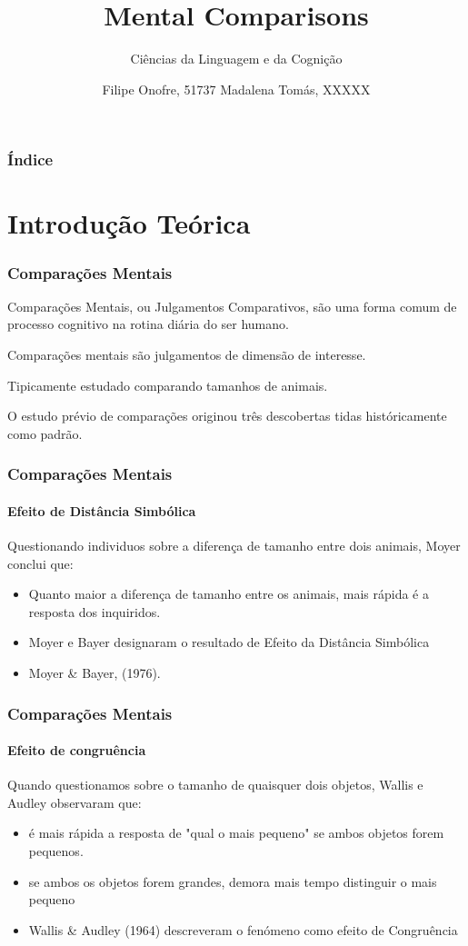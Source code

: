 \documentclass{beamer}
\title{Mental Comparisons}
\subtitle{Ciências da Linguagem e da Cognição}
\author{Filipe Onofre, 51737 \linebreak Madalena Tomás, XXXXX}
\begin{document}
\begin{frame}
	\titlepage
\end{frame}
\begin{frame}
	\frametitle{Índice}
	\tableofcontents
\end{frame}

\section{Introdução Teórica}

\begin{frame}
	\frametitle{Comparações Mentais}
	\begin{description}
		\item Comparações Mentais, ou Julgamentos Comparativos, são uma forma comum de processo cognitivo na rotina diária do ser humano.
		\item Comparações mentais são julgamentos de dimensão de interesse.
		\item Tipicamente estudado comparando tamanhos de animais.
		\item O estudo prévio de comparações originou três descobertas tidas históricamente como padrão. 
	\end{description}
\end{frame}
\begin{frame}
	\frametitle{Comparações Mentais}
	\framesubtitle{Efeito de Distância Simbólica}
	Questionando individuos sobre a diferença de tamanho entre dois animais, Moyer conclui que:
	\begin{itemize}
	\item Quanto maior a diferença de tamanho entre os animais, mais rápida é a resposta dos inquiridos.
	\item 	Moyer e Bayer designaram o resultado de Efeito da Distância Simbólica
	\item Moyer \& Bayer, (1976).
	\end{itemize}
\end{frame}
\begin{frame}
	\frametitle{Comparações Mentais}
	\framesubtitle{Efeito de congruência}
	
	Quando questionamos sobre o tamanho de quaisquer dois objetos, Wallis e Audley observaram que:
	
	\begin{itemize}
	\item é mais rápida a resposta de "qual o mais pequeno" se ambos objetos forem pequenos.
	
	\item se ambos os objetos forem grandes, demora mais tempo distinguir o mais pequeno
	
	\item Wallis \& Audley (1964) descreveram o fenómeno como efeito de Congruência
	\end{itemize}
\end{frame}
\end{document}
